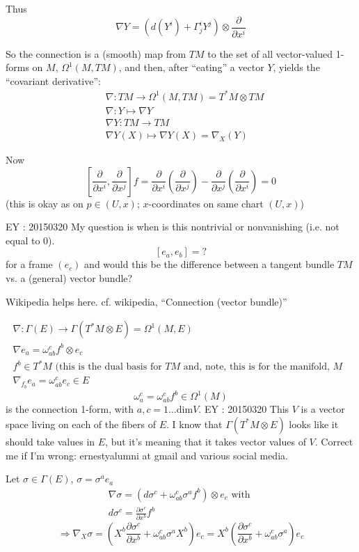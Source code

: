 \documentclass[10pt]{amsart}
\begin{document}
\begin{multicols*}{2}
	Thus
	\[
	\nabla Y = (d(Y^i) + \Gamma^i_j Y^j ) \otimes \frac{ \partial }{ \partial x^i}
	\]
	
	So the connection is a (smooth) map from $TM$ to the set of all vector-valued 1-forms on $M$, $\Omega^1(M,TM)$, and then, after ``eating'' a vector $Y$, yields the ``covariant derivative'':
	\[
	\begin{aligned}
	& \nabla: TM \to \Omega^1(M,TM) = T^*M \otimes TM \\ 
	& \nabla : Y \mapsto \nabla Y \\ 
	& \nabla Y : TM \to TM \\
	& \nabla Y(X) \mapsto \nabla Y(X) = \nabla_X(Y)
	\end{aligned}
	\]
	
	Now
	\[
	\left[ \frac{ \partial }{ \partial x^i} , \frac{ \partial }{ \partial x^j} \right] f = \frac{ \partial }{ \partial x^i } \left( \frac{ \partial }{ \partial x^j} \right) - \frac{ \partial }{ \partial x^j } \left( \frac{ \partial }{ \partial x^i} \right) = 0 
	\]
	(this is okay as on $p \in (U,x)$; $x$-coordinates on same chart $(U,x)$)
	
	EY : 20150320 My question is when is this nontrivial or nonvanishing (i.e. not equal to $0$).
	\[
	[e_a,e_b] = ?
	\]
	for a frame $(e_c)$ and would this be the difference between a tangent bundle $TM$ vs. a (general) vector bundle?
	
	Wikipedia helps here. cf. wikipedia, ``Connection (vector bundle)''
	
	\[
	\begin{gathered}
	\nabla : \Gamma(E) \to \Gamma(T^*M \otimes E) = \Omega^1(M,E) \\
	\nabla e_a = \omega^c_{ab} f^b \otimes e_c \\ 
	f^b \in T^*M \text{ (this is the dual basis for $TM$ and, note, this is for the manifold, $M$ } \\
	\nabla_{f_b}e_a = \omega^c_{ab} e_c \in E
	\end{gathered}
	\]
	\[
	\omega^c_a  = \omega^c_{ab} f^b \in \Omega^1(M)
	\]
	is the connection 1-form, with $a,c = 1 \dots \text{dim}V$.  EY : 20150320 This $V$ is a vector space living on each of the fibers of $E$.   I know that $\Gamma(T^*M \otimes E)$ looks like it should take values in $E$, but it's meaning that it takes vector values of $V$.  Correct me if I'm wrong: ernestyalumni at gmail and various social media.
	
	Let $\sigma \in \Gamma(E)$, $\sigma = \sigma^ae_a$  
	\[
	\begin{gathered}
	\nabla \sigma = (d\sigma^c + \omega^c_{ab} \sigma^a f^b) \otimes e_c \text{ with } \\ 
	d\sigma^c = \frac{ \partial \sigma^c}{ \partial x^b } f^b 
	\end{gathered}
	\]
	\[
	\Longrightarrow \nabla_X \sigma = \left( X^b \frac{ \partial \sigma^c}{ \partial x^b} + \omega^c_{ab} \sigma^a X^b \right)e_c = X^b \left( \frac{ \partial \sigma^c}{ \partial x^b } + \omega^c_{ab} \sigma^a \right)e_c
	\]
	

\end{multicols*}
\end{document}
